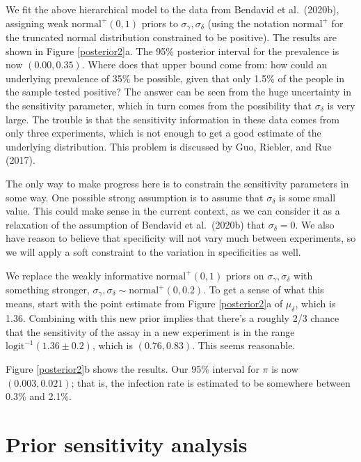 \documentclass[11pt]{article}
\begin{document}
We  fit the above hierarchical model to the data from Bendavid et al.\ (2020b), assigning weak $\mbox{normal}^+(0,1)$ priors to $\sigma_{\gamma},\sigma_{\delta}$ (using the notation $\mbox{normal}^+$ for the truncated normal distribution constrained to be positive).  The results are shown in Figure \ref{posterior2}a.  The 95\% posterior interval for the prevalence is now $(0.00, 0.35)$.  Where does that upper bound come from:  how could an underlying prevalence of 35\% be possible, given that only 1.5\% of the people in the sample tested positive?  The answer can be seen from the huge uncertainty in the sensitivity parameter, which in turn comes from the possibility that $\sigma_{\delta}$ is very large.  The trouble is that the sensitivity information in these data comes from only three experiments, which is not enough to get a good estimate of the underlying distribution.  This problem is discussed by Guo, Riebler, and Rue (2017).

The only way to make progress here is to constrain the sensitivity parameters in some way.  One possible strong assumption is to assume that $\sigma_{\delta}$ is some small value.  This could make sense in the current context, as we can consider it as a relaxation of the assumption of Bendavid et al.\ (2020b) that $\sigma_{\delta} = 0$.  We also have reason to believe that specificity will not vary much between experiments, so we will apply a soft constraint to the variation in specificities as well.

We replace the weakly informative $\mbox{normal}^+(0, 1)$ priors on $\sigma_{\gamma},\sigma_{\delta}$ with something stronger,
$\sigma_{\gamma}, \sigma_{\delta}\sim\mbox{normal}^+(0, 0.2)$.  To get a sense of what this means, start with the point estimate from Figure \ref{posterior2}a of $\mu_{\delta}$, which is 1.36. Combining with this new prior implies that there's a roughly 2/3 chance that the sensitivity of the assay in a new experiment is in the range $\mbox{logit}^{-1}(1.36 \pm 0.2)$, which is $(0.76, 0.83)$. This seems reasonable.

Figure \ref{posterior2}b shows the results.  Our 95\% interval for $\pi$ is now $(0.003, 0.021)$; that is, the infection rate is estimated to be somewhere between 0.3\% and 2.1\%.

\section{Prior sensitivity analysis}
\end{document}
